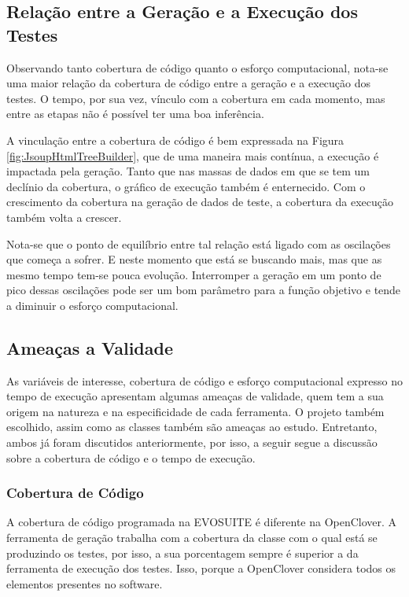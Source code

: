 \subsection{Relação entre a Geração e a Execução dos Testes}

Observando tanto cobertura de código quanto o esforço computacional, nota-se uma maior relação da cobertura de código entre a geração e a execução dos testes. O tempo, por sua vez, vínculo com a cobertura em cada momento, mas entre as etapas não é possível ter uma boa inferência.

A vinculação entre a cobertura de código é bem expressada na Figura \ref{fig:JsoupHtmlTreeBuilder}, que de uma maneira mais contínua, a execução é impactada pela geração. Tanto que nas massas de dados em que se tem um declínio da cobertura, o gráfico de execução também é enternecido. Com o crescimento da cobertura na geração de dados de teste, a cobertura da execução também volta a crescer. 

Nota-se que o ponto de equilíbrio entre tal relação está ligado com as oscilações que começa a sofrer. E neste momento que está se buscando mais, mas que as mesmo tempo tem-se pouca evolução. Interromper a geração em um ponto de pico dessas oscilações pode ser um bom parâmetro para a função objetivo e tende a diminuir o esforço computacional.

\subsection{Ameaças a Validade}

As variáveis de interesse, cobertura de código e esforço computacional expresso no tempo de execução apresentam algumas ameaças de validade, quem tem a sua origem na natureza e na especificidade de cada ferramenta. O projeto também escolhido, assim como as classes também são ameaças ao estudo. Entretanto, ambos já foram discutidos anteriormente, por isso, a seguir segue a discussão sobre a cobertura de código e o tempo de execução.

\subsubsection{Cobertura de Código}

A cobertura de código programada na EVOSUITE é diferente na OpenClover. A ferramenta de geração trabalha com a cobertura da classe com o qual está se produzindo os testes, por isso, a sua porcentagem sempre é superior a da ferramenta de execução dos testes. Isso, porque a OpenClover considera todos os elementos presentes no software.

